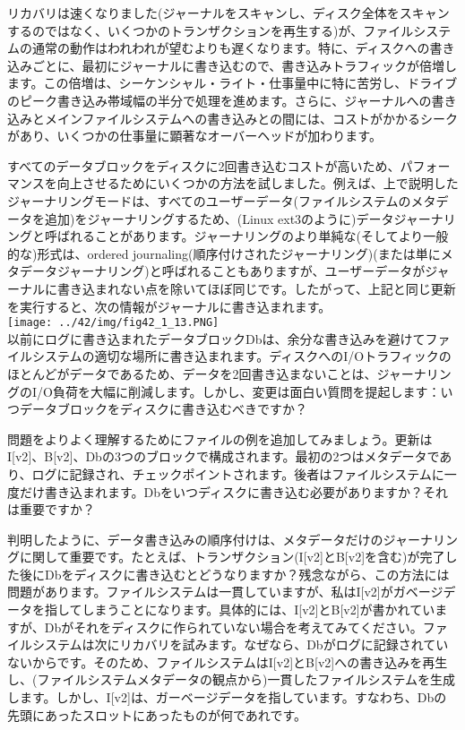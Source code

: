 リカバリは速くなりました(ジャーナルをスキャンし、ディスク全体をスキャンするのではなく、いくつかのトランザクションを再生する)が、ファイルシステムの通常の動作はわれわれが望むよりも遅くなります。特に、ディスクへの書き込みごとに、最初にジャーナルに書き込むので、書き込みトラフィックが倍増します。この倍増は、シーケンシャル・ライト・仕事量中に特に苦労し、ドライブのピーク書き込み帯域幅の半分で処理を進めます。さらに、ジャーナルへの書き込みとメインファイルシステムへの書き込みとの間には、コストがかかるシークがあり、いくつかの仕事量に顕著なオーバーヘッドが加わります。

すべてのデータブロックをディスクに2回書き込むコストが高いため、パフォーマンスを向上させるためにいくつかの方法を試しました。例えば、上で説明したジャーナリングモードは、すべてのユーザーデータ(ファイルシステムのメタデータを追加)をジャーナリングするため、(Linux
ext3のように)データジャーナリングと呼ばれることがあります。ジャーナリングのより単純な(そしてより一般的な)形式は、ordered
journaling(順序付けされたジャーナリング)(または単にメタデータジャーナリング)と呼ばれることもありますが、ユーザーデータがジャーナルに書き込まれない点を除いてほぼ同じです。したがって、上記と同じ更新を実行すると、次の情報がジャーナルに書き込まれます。\\
\texttt{[image: ../42/img/fig42\_1\_13.PNG]}\\
以前にログに書き込まれたデータブロックDbは、余分な書き込みを避けてファイルシステムの適切な場所に書き込まれます。ディスクへのI/Oトラフィックのほとんどがデータであるため、データを2回書き込まないことは、ジャーナリングのI/O負荷を大幅に削減します。しかし、変更は面白い質問を提起します：いつデータブロックをディスクに書き込むべきですか？

問題をよりよく理解するためにファイルの例を追加してみましょう。更新はI{[}v2{]}、B{[}v2{]}、Dbの3つのブロックで構成されます。最初の2つはメタデータであり、ログに記録され、チェックポイントされます。後者はファイルシステムに一度だけ書き込まれます。Dbをいつディスクに書き込む必要がありますか？それは重要ですか？

判明したように、データ書き込みの順序付けは、メタデータだけのジャーナリングに関して重要です。たとえば、トランザクション(I{[}v2{]}とB{[}v2{]}を含む)が完了した後にDbをディスクに書き込むとどうなりますか？残念ながら、この方法には問題があります。ファイルシステムは一貫していますが、私はI{[}v2{]}がガベージデータを指してしまうことになります。具体的には、I{[}v2{]}とB{[}v2{]}が書かれていますが、Dbがそれをディスクに作られていない場合を考えてみてください。ファイルシステムは次にリカバリを試みます。なぜなら、Dbがログに記録されていないからです。そのため、ファイルシステムはI{[}v2{]}とB{[}v2{]}への書き込みを再生し、(ファイルシステムメタデータの観点から)一貫したファイルシステムを生成します。しかし、I{[}v2{]}は、ガーベージデータを指しています。すなわち、Dbの先頭にあったスロットにあったものが何であれです。

